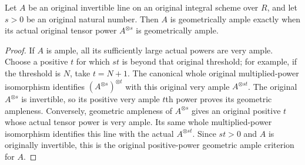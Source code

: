 \begin{theorem}
\label{thm:fc-original-ample-line-positive-powers}
\leanok
{}
Let $A$ be an original invertible line on an original integral scheme
over $R$, and let $s>0$ be an original natural number. Then $A$ is
geometrically ample exactly when its actual original tensor power
$A^{\otimes s}$ is geometrically ample.
\end{theorem}
\begin{proof}
If $A$ is ample, all its sufficiently large actual powers are very ample.
Choose a positive $t$ for which $st$ is beyond that original threshold;
for example, if the threshold is $N$, take $t=N+1$. The canonical whole
original multiplied-power isomorphism identifies
$(A^{\otimes s})^{\otimes t}$ with this original very ample
$A^{\otimes st}$. The original $A^{\otimes s}$ is invertible, so its
positive very ample $t$th power proves its geometric ampleness.
Conversely, geometric ampleness of $A^{\otimes s}$ gives an original
positive $t$ whose actual tensor power is very ample. Its same whole
multiplied-power isomorphism identifies this line with the actual
$A^{\otimes st}$. Since $st>0$ and $A$ is originally invertible, this
is the original positive-power geometric ample criterion for $A$.
\end{proof}

